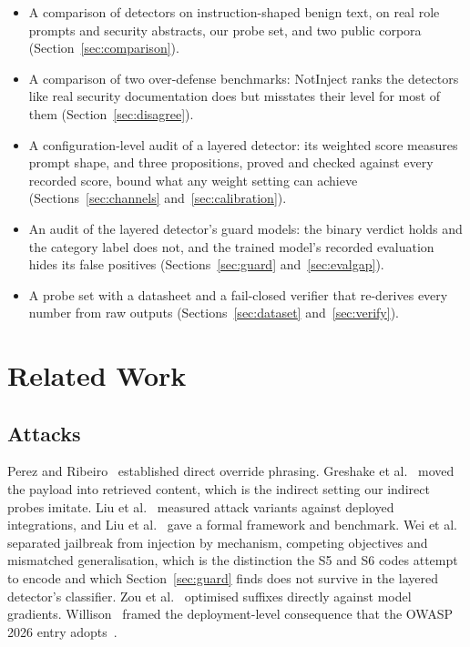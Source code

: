 \documentclass[conference]{IEEEtran}
\begin{document}
\begin{itemize}
\item A comparison of \NDetectorsCompared{} detectors on instruction-shaped benign text,
  on real role prompts and security abstracts, our probe set, and two public
  corpora (Section~\ref{sec:comparison}).
\item A comparison of two over-defense benchmarks: NotInject ranks the
  detectors like real security documentation does but misstates their level
  for most of them (Section~\ref{sec:disagree}).
\item A configuration-level audit of a layered detector: its weighted score
  measures prompt shape, and three propositions, proved and checked against
  every recorded score, bound what any weight setting can achieve
  (Sections~\ref{sec:channels} and~\ref{sec:calibration}).
\item An audit of the layered detector's guard models: the binary verdict
  holds and the category label does not, and the trained model's recorded
  evaluation hides its false positives (Sections~\ref{sec:guard}
  and~\ref{sec:evalgap}).
\item A probe set with a datasheet and a fail-closed verifier that re-derives
  every number from raw outputs (Sections~\ref{sec:dataset}
  and~\ref{sec:verify}).
\end{itemize}

\section{Related Work}\label{sec:related}

\subsection{Attacks}
Perez and Ribeiro~\cite{perez2022ignore} established direct override phrasing.
Greshake et al.~\cite{greshake2023not} moved the payload into retrieved
content, which is the indirect setting our indirect probes imitate. Liu et
al.~\cite{liu2023prompt} measured attack variants against deployed
integrations, and Liu et al.~\cite{liu2024formalizing} gave a formal framework
and benchmark. Wei et al.~\cite{wei2023jailbroken} separated jailbreak from
injection by mechanism, competing objectives and mismatched generalisation,
which is the distinction the S5 and S6 codes attempt to encode and which
Section~\ref{sec:guard} finds does not survive in the layered detector's classifier. Zou
et al.~\cite{zou2023universal} optimised suffixes directly against model
gradients. Willison~\cite{willison2023injection, willison2025trifecta} framed
the deployment-level consequence that the OWASP 2026 entry
adopts~\cite{owasp2026}.
\end{document}
